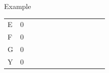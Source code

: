\documentclass{bredelebeamer}
\begin{document}
\begin{frame}{Example}
\begin{table}[]
\begin{tabular}{*{13}{p{0.4cm}}}
\multicolumn{1}{l|}{E}  & \multicolumn{1}{l|}{0} & \multicolumn{1}{l|}{}  & \multicolumn{1}{l|}{}  & \multicolumn{1}{l|}{}  & \multicolumn{1}{l|}{}  & \multicolumn{1}{l|}{}  & \multicolumn{1}{l|}{}  & \multicolumn{1}{l|}{}  & \multicolumn{1}{l|}{}  & \multicolumn{1}{l|}{}  & \multicolumn{1}{l|}{}  & \multicolumn{1}{l|}{}  \\ \cline{2-13} 
\multicolumn{1}{l|}{F}  & \multicolumn{1}{l|}{0} & \multicolumn{1}{l|}{}  & \multicolumn{1}{l|}{}  & \multicolumn{1}{l|}{}  & \multicolumn{1}{l|}{}  & \multicolumn{1}{l|}{}  & \multicolumn{1}{l|}{}  & \multicolumn{1}{l|}{}  & \multicolumn{1}{l|}{}  & \multicolumn{1}{l|}{}  & \multicolumn{1}{l|}{}  & \multicolumn{1}{l|}{}  \\ \cline{2-13} 
\multicolumn{1}{l|}{G}  & \multicolumn{1}{l|}{0} & \multicolumn{1}{l|}{}  & \multicolumn{1}{l|}{}  & \multicolumn{1}{l|}{}  & \multicolumn{1}{l|}{}  & \multicolumn{1}{l|}{}  & \multicolumn{1}{l|}{}  & \multicolumn{1}{l|}{}  & \multicolumn{1}{l|}{}  & \multicolumn{1}{l|}{}  & \multicolumn{1}{l|}{}  & \multicolumn{1}{l|}{}  \\ \cline{2-13} 
\multicolumn{1}{l|}{Y}  & \multicolumn{1}{l|}{0} & \multicolumn{1}{l|}{}  & \multicolumn{1}{l|}{}  & \multicolumn{1}{l|}{}  & \multicolumn{1}{l|}{}  & \multicolumn{1}{l|}{}  & \multicolumn{1}{l|}{}  & \multicolumn{1}{l|}{}  & \multicolumn{1}{l|}{}  & \multicolumn{1}{l|}{}  & \multicolumn{1}{l|}{}  & \multicolumn{1}{l|}{}  \\ \cline{2-13} 
\end{tabular}
\end{table}
     
 \end{frame}
 
\end{document}
